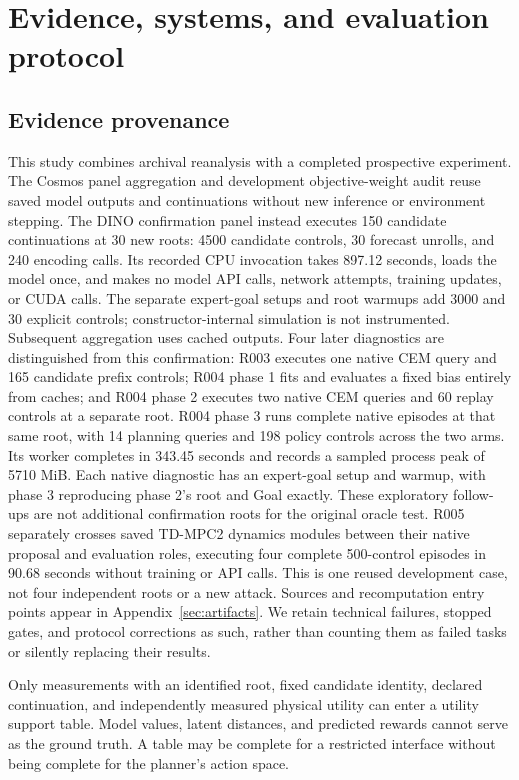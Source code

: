 \documentclass[11pt]{article}
\begin{document}
\DecisionLeverageRelatedWork

\DecisionLeverageTheory

\section{Evidence, systems, and evaluation protocol}
\label{sec:protocol}
\subsection{Evidence provenance}
This study combines archival reanalysis with a completed prospective experiment.
The Cosmos panel aggregation and development objective-weight audit reuse saved
model outputs and continuations without new inference or environment stepping.
The DINO confirmation panel instead executes 150 candidate continuations at
30 new roots: 4500 candidate controls, 30 forecast unrolls, and 240 encoding
calls. Its recorded CPU invocation takes 897.12 seconds, loads the model once,
and makes no model API calls, network attempts, training updates, or CUDA calls.
The separate expert-goal setups and root warmups add 3000 and 30 explicit
controls; constructor-internal simulation is not instrumented. Subsequent
aggregation uses cached outputs. Four later diagnostics are distinguished
from this confirmation: R003 executes one native CEM query and 165 candidate
prefix controls; R004 phase 1 fits and evaluates a fixed bias entirely from
caches; and R004 phase 2 executes two native CEM queries and 60 replay controls
at a separate root. R004 phase 3 runs complete native episodes at that same
root, with 14 planning queries and 198 policy controls across the two arms.
Its worker completes in 343.45 seconds and records a sampled process peak of
5710 MiB. Each native diagnostic has an expert-goal setup and warmup, with
phase 3 reproducing phase 2's root and Goal exactly. These exploratory
follow-ups are not additional confirmation roots for the original oracle test.
R005 separately crosses saved TD-MPC2 dynamics modules between their native
proposal and evaluation roles, executing four complete 500-control episodes
in 90.68 seconds without training or API calls. This is one reused development
case, not four independent roots or a new attack.
Sources and recomputation entry points appear in Appendix~\ref{sec:artifacts}.
We retain technical failures, stopped gates, and protocol corrections as such,
rather than counting them as failed tasks or silently replacing their results.

Only measurements with an identified root, fixed candidate identity, declared
continuation, and independently measured physical utility can enter a utility
support table. Model values, latent distances, and predicted rewards cannot
serve as the ground truth. A table may be complete for a restricted interface
without being complete for the planner's action space.
\end{document}
